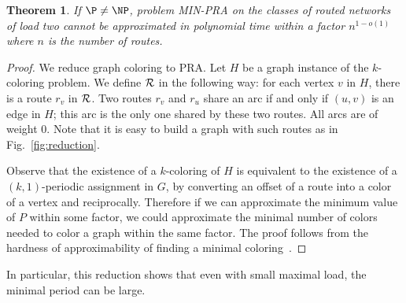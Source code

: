 \documentclass[a4paper,10pt]{article}
\newtheorem{theorem}{Theorem}
\begin{document}
{\begin{theorem}\label{th:inapprox}
If $\P \neq \NP$, problem MIN-PRA on the classes of routed networks of load two cannot be approximated in polynomial time within a factor $n^{1-o(1)}$ where $n$ is the number of routes.
\end{theorem}

\begin{proof}
 We reduce graph coloring to PRA. Let $H$ be a graph instance of the $k$-coloring problem. 
 We define ${\cal R}$ in the following way: for each vertex $v$ in $H$, there is a route $r_v$ in ${\cal R}$.
 Two routes $r_v$ and $r_u$ share an arc if and only if $(u,v)$ is an edge in $H$; this arc is the only one shared by these two routes. All arcs are of weight $0$. Note that it is easy to build a graph with such routes as in Fig.~\ref{fig:reduction}.
 
 Observe that the existence of a $k$-coloring of $H$ is equivalent to the existence of a $(k,1)$-periodic assignment in $G$, 
 by converting an offset of a route into a color of a vertex and reciprocally. Therefore if we can approximate the minimum value of $P$ within some factor, we could approximate the minimal number of colors needed to color a graph within the same factor. The proof follows from the hardness of approximability of finding a minimal coloring~\cite{zuckerman2006linear}.
\end{proof}


In particular, this reduction shows that even with small maximal load, the minimal period can be large.

    \begin{figure}[ht]
    
\end{figure}}
\end{document}
